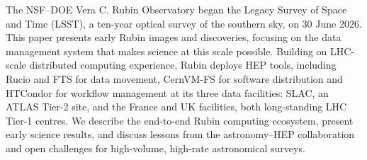 The NSF--DOE Vera C. Rubin Observatory began the Legacy Survey of Space and Time (LSST), a ten-year optical survey of the southern sky, on 30 June 2026. This paper presents early Rubin images and discoveries, focusing on the data management system that makes science at this scale possible. Building on  LHC-scale distributed computing experience, Rubin deploys HEP tools, including Rucio and FTS for data movement, CernVM-FS for software distribution and HTCondor for workflow management at its three data facilities: SLAC, an ATLAS Tier-2 site, and the France and UK facilities, both long-standing LHC Tier-1 centres.  We describe the end-to-end Rubin computing ecosystem, present early science results, and discuss lessons from the astronomy--HEP collaboration and open challenges for high-volume, high-rate astronomical surveys.

